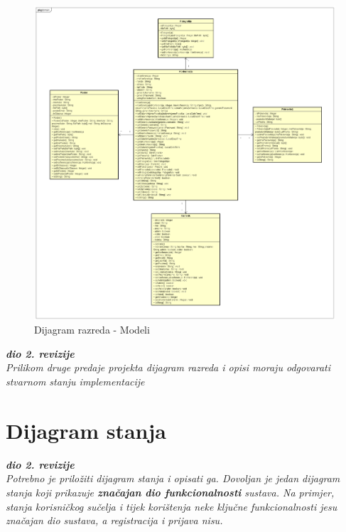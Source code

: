 			\begin{figure} [hbt!]
				\includegraphics[width=\linewidth]{Slike/ClassDiagramModelsRevised}
				\caption{Dijagram razreda - Modeli}
			\end{figure}
			
			\clearpage
			 
			\textbf{\textit{dio 2. revizije}}\\			
			
			\textit{Prilikom druge predaje projekta dijagram razreda i opisi moraju odgovarati stvarnom stanju implementacije}
			
			
			
			\eject
		
		\section{Dijagram stanja}
			
			
			\textbf{\textit{dio 2. revizije}}\\
			
			\textit{Potrebno je priložiti dijagram stanja i opisati ga. Dovoljan je jedan dijagram stanja koji prikazuje \textbf{značajan dio funkcionalnosti} sustava. Na primjer, stanja korisničkog sučelja i tijek korištenja neke ključne funkcionalnosti jesu značajan dio sustava, a registracija i prijava nisu. }
			
